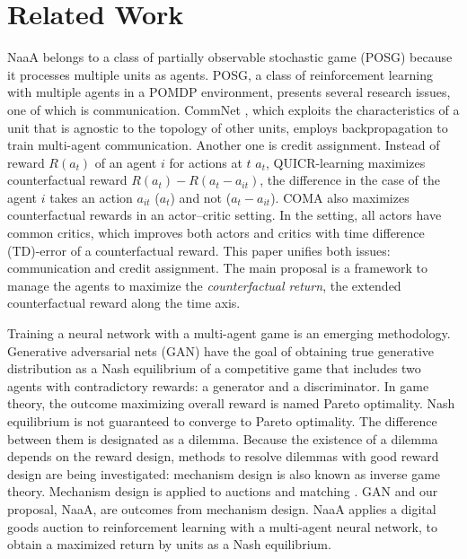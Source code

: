 \section{Related Work}
NaaA belongs to a class of partially observable stochastic game (POSG) \citep{hansen2004dynamic} because it processes multiple units as agents.
POSG, a class of reinforcement learning with multiple agents in a POMDP environment, presents several research issues, one of which is communication.
CommNet \citep{sukhbaatar2016learning}, which exploits the characteristics of a unit that is agnostic to the topology of other units, employs backpropagation to train multi-agent communication.
Another one is credit assignment.
Instead of reward $R(a_t)$ of an agent $i$ for actions at $t$ $a_t$, 
QUICR-learning \citep{agogino2006quicr} maximizes counterfactual reward $R(a_t) - R(a_t - a_{it})$, the difference in the case of the agent $i$ takes an action $a_{it}$ ($a_t$) and not ($a_t-a_{it}$).
COMA \citep{foerster2017counterfactual} also maximizes counterfactual rewards in an actor--critic setting.
In the setting, all actors have common critics, which improves both actors and critics with time difference (TD)-error of a counterfactual reward.
This paper unifies both issues: communication and credit assignment.
The main proposal is a framework to manage the agents to maximize the {\em counterfactual return}, the extended counterfactual reward along the time axis.

Training a neural network with a multi-agent game is an emerging methodology.
Generative adversarial nets (GAN) \citep{goodfellow2014generative} have the goal of obtaining true generative distribution as a Nash equilibrium of a competitive game that includes two agents with contradictory rewards: a generator and a discriminator. 
In game theory, the outcome maximizing overall reward is named Pareto optimality.
Nash equilibrium is not guaranteed to converge to Pareto optimality. The difference between them is designated as a dilemma.
Because the existence of a dilemma depends on the reward design, methods to resolve dilemmas with good reward design are being investigated: mechanism design \citep{myerson1983mechanism} is also known as inverse game theory.
Mechanism design is applied to auctions \citep{vickrey1961counterspeculation} and matching \citep{gale1962college}.
GAN and our proposal, NaaA, are outcomes from mechanism design.
NaaA applies a digital goods auction \citep{guruswami2005profit} to reinforcement learning with a multi-agent neural network, 
to obtain a maximized return by units as a Nash equilibrium.

